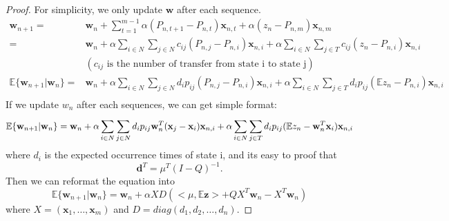 \begin{proof}
    For simplicity, we only update $ \mathbf{w} $ after each sequence.
    \begin{align*}
        \mathbf{w}_{n+1} =& \mathbf{w}_{n} + \sum^{m-1}_{t=1} \alpha(P_{n,t+1} - P_{n,t}) \mathbf{x}_{n,t}
        + \alpha (z_n - P_{n,m}) \mathbf{x}_{n,m} \\
        =& \mathbf{w}_{n} + \alpha\sum^{}_{i \in N} \sum^{}_{j \in N} c_{ij} (P_{n,j} - P_{n,i}) \mathbf{x}_{n,i} 
        +\alpha\sum^{}_{i \in N} \sum^{}_{j \in T} c_{ij} (z_n - P_{n,i}) \mathbf{x}_{n,i} \\
         &(c_{ij} \text{\ is the number of transfer from state i to state j})\\
        \mathbb{E}\{\mathbf{w}_{n+1} | \mathbf{w}_{n}\} 
        =& \mathbf{w}_{n} + \alpha\sum^{}_{i \in N} \sum^{}_{j \in N} d_i p_{ij} (P_{n,j} - P_{n,i}) \mathbf{x}_{n,i} 
        +\alpha\sum^{}_{i \in N} \sum^{}_{j \in T} d_i p_{ij} (\mathbb{E}z_{n} - P_{n,i}) \mathbf{x}_{n,i} \\
    \end{align*}
    If we update $w_n$ after each sequences, we can get simple format:
    \[
        \mathbb{E}\{\mathbf{w}_{n+1} | \mathbf{w}_{n} \}
        = \mathbf{w}_n + \alpha\sum^{}_{i \in N} \sum^{}_{j \in N} d_i p_{ij} 
        \mathbf{w}_n^T (\mathbf{x}_j - \mathbf{x}_i) \mathbf{x}_{n,i} 
        +\alpha\sum^{}_{i \in N} \sum^{}_{j \in T} d_i p_{ij} 
        (\mathbb{E}z_{n} - \mathbf{w}_n^T\mathbf{x}_i) \mathbf{x}_{n,i} \\
    \]
    where $d_i$ is the expected occurrence times of state i, and its easy to proof that
    \[ \mathbf{d}^T = \mu^T {(I-Q)}^{-1}.\]       
    Then we can reformat the equation into
    \[
        \mathbb{E}\{\mathbf{w}_{n+1} | \mathbf{w}_{n} \} = \mathbf{w}_n
        + \alpha X D(<\mu, \mathbb E \mathbf z> + QX^T\mathbf{w}_n - X^T\mathbf{w}_n)
    \]
    where $X = (\mathbf{x}_1, \ldots, \mathbf{x}_m)$ and 
    $ D = diag(d_1, d_2, \ldots, d_n) $.


\end{proof}
